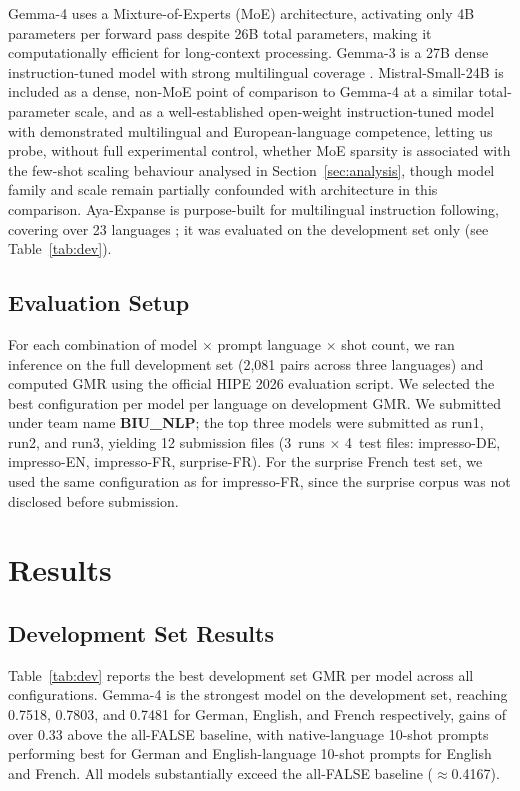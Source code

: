 \documentclass[
]{ceurart}
\theoremstyle{definition}
\begin{document}
Gemma-4 \citep{team2026gemma4} uses a Mixture-of-Experts (MoE) architecture, activating only 4B parameters per forward pass despite 26B total parameters, making it computationally efficient for long-context processing.
Gemma-3 is a 27B dense instruction-tuned model with strong multilingual coverage \citep{team2025gemma3}.
Mistral-Small-24B is included as a dense, non-MoE point of comparison to Gemma-4 at a similar total-parameter scale, and as a well-established open-weight instruction-tuned model with demonstrated multilingual and European-language competence, letting us probe, without full experimental control, whether MoE sparsity is associated with the few-shot scaling behaviour analysed in Section~\ref{sec:analysis}, though model family and scale remain partially confounded with architecture in this comparison.
Aya-Expanse is purpose-built for multilingual instruction following, covering over 23 languages \citep{ustun-etal-2024-aya}; it was evaluated on the development set only (see Table~\ref{tab:dev}).

\subsection{Evaluation Setup}

For each combination of model $\times$ prompt language $\times$ shot count, we ran inference on the full development set (2,081 pairs across three languages) and computed GMR using the official HIPE 2026 evaluation script.
We selected the best configuration per model per language on development GMR.
We submitted under team name \textbf{BIU\_NLP}; the top three models were submitted as run1, run2, and run3, yielding 12 submission files (3~runs $\times$ 4~test files: impresso-DE, impresso-EN, impresso-FR, surprise-FR).
For the surprise French test set, we used the same configuration as for impresso-FR, since the surprise corpus was not disclosed before submission.


\section{Results}
\label{sec:results}

\subsection{Development Set Results}

Table~\ref{tab:dev} reports the best development set GMR per model across all configurations.
Gemma-4 is the strongest model on the development set, reaching 0.7518, 0.7803, and 0.7481 for German, English, and French respectively, gains of over 0.33 above the all-FALSE baseline, with native-language 10-shot prompts performing best for German and English-language 10-shot prompts for English and French.
All models substantially exceed the all-FALSE baseline ($\approx$0.4167).
\end{document}
